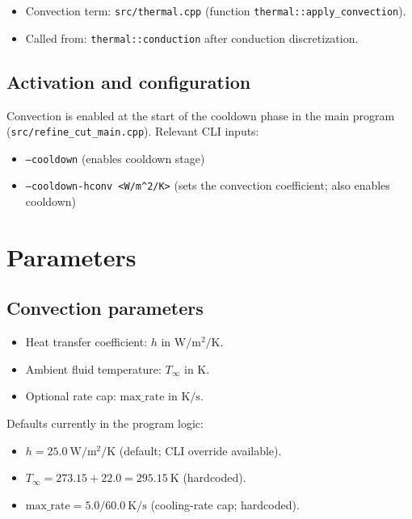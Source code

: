 \documentclass[11pt]{article}
\begin{document}
\begin{itemize}
  \item Convection term: \texttt{src/thermal.cpp} (function \texttt{thermal::apply\_convection}).
  \item Called from: \texttt{thermal::conduction} after conduction discretization.
\end{itemize}

\subsection{Activation and configuration}

Convection is enabled at the start of the cooldown phase in the main program (\texttt{src/refine\_cut\_main.cpp}). Relevant CLI inputs:

\begin{itemize}
  \item \texttt{--cooldown} (enables cooldown stage)
  \item \texttt{--cooldown-hconv <W/m\^{}2/K>} (sets the convection coefficient; also enables cooldown)
\end{itemize}

\section{Parameters}

\subsection{Convection parameters}

\begin{itemize}
  \item Heat transfer coefficient: $h$ in $\mathrm{W/m^2/K}$.
  \item Ambient fluid temperature: $T_\infty$ in $\mathrm{K}$.
  \item Optional rate cap: $\mathrm{max\_rate}$ in $\mathrm{K/s}$.
\end{itemize}

Defaults currently in the program logic:

\begin{itemize}
  \item $h = 25.0\ \mathrm{W/m^2/K}$ (default; CLI override available).
  \item $T_\infty = 273.15 + 22.0 = 295.15\ \mathrm{K}$ (hardcoded).
  \item $\mathrm{max\_rate} = 5.0/60.0\ \mathrm{K/s}$ (cooling-rate cap; hardcoded).
\end{itemize}
\end{document}
